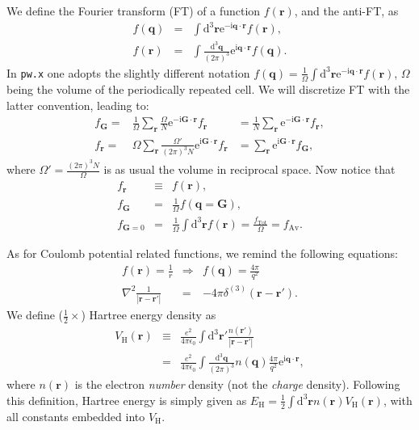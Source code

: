 \documentclass[a4paper,twocolumn,12pt]{article}
\newcommand{\var}[1]{{\tt #1}}
\begin{document}
We define the Fourier transform (FT) 
of a function $f(\mathbf{r})$, and the anti-FT, as
\begin{eqnarray}
\label{eq:FTL2R3}
f(\mathbf{q}) &=& \int \mathrm{d}^3 \mathbf{r} \mathrm{e}^{ -\mathrm{i} \mathbf{q} \cdot \mathbf{r}} f(\mathbf{r}),\\
f(\mathbf{r}) &=& \int \frac{\mathrm{d}^3 \mathbf{q}}{(2\pi)^3} \mathrm{e}^{ \mathrm{i} \mathbf{q} \cdot \mathbf{r}} f(\mathbf{q}).
\end{eqnarray}
In \var{pw.x} one adopts the slightly different notation
$f(\mathbf{q})=\frac{1}{\Omega} \int \mathrm{d}^3 \mathbf{r}
\mathrm{e}^ { -\mathrm{i} \mathbf{q} \cdot \mathbf{r}} f(\mathbf{r})$,
$\Omega$ being the volume of the periodically repeated cell.
We will discretize FT with the latter convention, leading to:
\begin{eqnarray}
\label{eq:discFT}f_\mathbf{G}=&\frac{1}{\Omega} \sum_\mathbf{r} \frac{\Omega}{N} \mathrm{e}^ { -\mathrm{i} \mathbf{G} \cdot \mathbf{r}} f_\mathbf{r}& =\frac{1}{N} \sum_\mathbf{r} \mathrm{e}^ { -\mathrm{i} \mathbf{G} \cdot \mathbf{r}} f_\mathbf{r},\\
f_\mathbf{r}=&{\Omega} \sum_\mathbf{r} \frac{\Omega'}{(2\pi)^3N} \mathrm{e}^ { \mathrm{i} \mathbf{G} \cdot \mathbf{r}} f_\mathbf{r}& = \sum_\mathbf{r} \mathrm{e}^ { \mathrm{i} \mathbf{G} \cdot \mathbf{r}} f_\mathbf{G},
\end{eqnarray}
where $\Omega'=\frac{(2\pi)^3N}{\Omega}$ is as usual the volume in
reciprocal space.  Now notice that
\begin{eqnarray}
f_\mathbf{r} &\equiv& f(\mathbf{r}),\\
f_\mathbf{G} &=& \frac{1}{\Omega} f(\mathbf{q}=\mathbf{G}),\\
f_{\mathbf{G}=0} &=& \frac{1}{\Omega} \int \mathrm{d}^3\mathbf{r} f(\mathbf{r})= \frac{f_\text{Tot}}{\Omega}=f_\text{Av}.
\end{eqnarray}

As for Coulomb potential related functions, we remind the following equations:
\begin{eqnarray}
f(\mathbf{r})=\frac{1}{r}&\Rightarrow& f(\mathbf{q})=\frac{4\pi}{q^2}\\
\nabla^2\frac{1}{|\mathbf{r}-\mathbf{r}'|}&=&-4\pi\delta^{(3)}(\mathbf{r}-\mathbf{r}').
\end{eqnarray}
We define ($\frac{1}{2}\times$) Hartree energy density as
\begin{eqnarray}
V_\text{H}(\mathbf{r})&\equiv&\frac{e^2}{4\pi\epsilon_0} \int \mathrm{d}^3\mathbf{r}' \frac{n(\mathbf{r}')}{|\mathbf{r}-\mathbf{r}'|}\nonumber\\
\label{eq:VHcont}&=& \frac{e^2}{4\pi\epsilon_0} \int \frac{\mathrm{d}^3\mathbf{q}}{(2\pi)^3} n(\mathbf{q}) \frac{4\pi}{q^2} \mathrm{e}^{ \mathrm{i} \mathbf{q} \cdot \mathbf{r}},
\end{eqnarray}
where $n(\mathbf{r})$ is the electron {\em number} density (not the
{\em charge} density).  Following this definition, Hartree energy is
simply given as $E_\text{H}=\frac{1}{2} \int \mathrm{d}^3\mathbf{r}
n(\mathbf{r}) V_\text{H}(\mathbf{r})$, with all constants embedded
into $V_\text{H}$.
\end{document}
